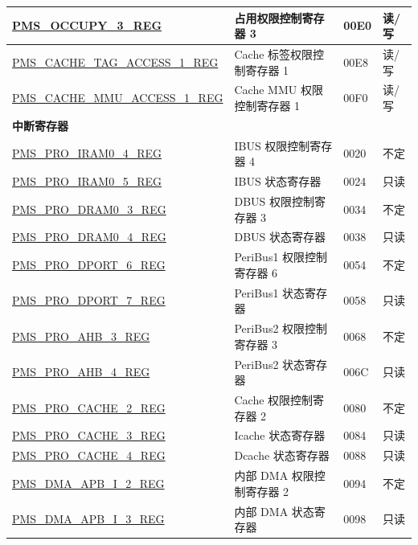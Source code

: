 \begin{longtable}{ |m{6cm} |m{7.2cm} | m{1.3cm} |m{1cm} | }
\hyperref[regdesc:PMSOCCUPY3REG]{PMS\_OCCUPY\_3\_REG} & 占用权限控制寄存器 3 & \hexprefix{}00E0 & 读/写 \\ \hline
\hyperref[regdesc:PMSCACHETAGACCESS1REG]{PMS\_CACHE\_TAG\_ACCESS\_1\_REG} & Cache 标签权限控制寄存器 1 & \hexprefix{}00E8 & 读/写 \\ \hline
\hyperref[regdesc:PMSCACHEMMUACCESS1REG]{PMS\_CACHE\_MMU\_ACCESS\_1\_REG} & Cache MMU 权限控制寄存器 1 & \hexprefix{}00F0 & 读/写 \\ \hline
\multicolumn{4}{|l|}{\textbf{中断寄存器}} \\ \hline
\hyperref[regdesc:PMSPROIRAM04REG]{PMS\_PRO\_IRAM0\_4\_REG} & IBUS 权限控制寄存器 4 & \hexprefix{}0020 & 不定 \\ \hline
\hyperref[regdesc:PMSPROIRAM05REG]{PMS\_PRO\_IRAM0\_5\_REG} & IBUS 状态寄存器 & \hexprefix{}0024 & 只读 \\ \hline
\hyperref[regdesc:PMSPRODRAM03REG]{PMS\_PRO\_DRAM0\_3\_REG} & DBUS 权限控制寄存器 3 & \hexprefix{}0034 & 不定 \\ \hline
\hyperref[regdesc:PMSPRODRAM04REG]{PMS\_PRO\_DRAM0\_4\_REG} & DBUS 状态寄存器 & \hexprefix{}0038 & 只读 \\ \hline
\hyperref[regdesc:PMSPRODPORT6REG]{PMS\_PRO\_DPORT\_6\_REG} & PeriBus1 权限控制寄存器 6 & \hexprefix{}0054 & 不定 \\ \hline
\hyperref[regdesc:PMSPRODPORT7REG]{PMS\_PRO\_DPORT\_7\_REG} & PeriBus1 状态寄存器 & \hexprefix{}0058 & 只读 \\ \hline
\hyperref[regdesc:PMSPROAHB3REG]{PMS\_PRO\_AHB\_3\_REG} & PeriBus2 权限控制寄存器 3 & \hexprefix{}0068 & 不定 \\ \hline
\hyperref[regdesc:PMSPROAHB4REG]{PMS\_PRO\_AHB\_4\_REG} & PeriBus2 状态寄存器 & \hexprefix{}006C &只读 \\ \hline
\hyperref[regdesc:PMSPROCACHE2REG]{PMS\_PRO\_CACHE\_2\_REG} & Cache 权限控制寄存器 2 & \hexprefix{}0080 & 不定 \\ \hline
\hyperref[regdesc:PMSPROCACHE3REG]{PMS\_PRO\_CACHE\_3\_REG} & Icache 状态寄存器 & \hexprefix{}0084 &只读 \\ \hline
\hyperref[regdesc:PMSPROCACHE4REG]{PMS\_PRO\_CACHE\_4\_REG} & Dcache 状态寄存器 & \hexprefix{}0088 &只读 \\ \hline
\hyperref[regdesc:PMSDMAAPBI2REG]{PMS\_DMA\_APB\_I\_2\_REG} & 内部 DMA 权限控制寄存器 2 & \hexprefix{}0094 & 不定 \\ \hline
\hyperref[regdesc:PMSDMAAPBI3REG]{PMS\_DMA\_APB\_I\_3\_REG} & 内部 DMA 状态寄存器 & \hexprefix{}0098 &只读 \\ \hline

\end{longtable}
